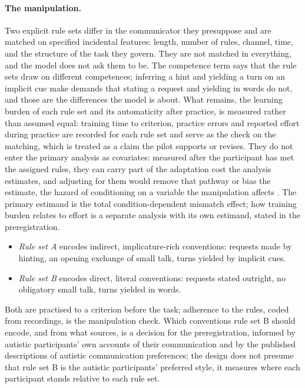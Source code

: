 \paragraph{The manipulation.} Two explicit rule sets differ in the communicator they presuppose and are matched on specified incidental features: length, number of rules, channel, time, and the structure of the task they govern. They are not matched in everything, and the model does not ask them to be. The competence term says that the rule sets draw on different competences; inferring a hint and yielding a turn on an implicit cue make demands that stating a request and yielding in words do not, and those are the differences the model is about. What remains, the learning burden of each rule set and its automaticity after practice, is measured rather than assumed equal: training time to criterion, practice errors and reported effort during practice are recorded for each rule set and serve as the check on the matching, which is treated as a claim the pilot supports or revises. They do not enter the primary analysis as covariates: measured after the participant has met the assigned rules, they can carry part of the adaptation cost the analysis estimates, and adjusting for them would remove that pathway or bias the estimate, the hazard of conditioning on a variable the manipulation affects \cite{MontgomeryNyhanTorres2018}. The primary estimand is the total condition-dependent mismatch effect; how training burden relates to effort is a separate analysis with its own estimand, stated in the preregistration.
\begin{itemize}[leftmargin=*]
\item \emph{Rule set A} encodes indirect, implicature-rich conventions: requests made by hinting, an opening exchange of small talk, turns yielded by implicit cues.
\item \emph{Rule set B} encodes direct, literal conventions: requests stated outright, no obligatory small talk, turns yielded in words.
\end{itemize}
Both are practised to a criterion before the task; adherence to the rules, coded from recordings, is the manipulation check. Which conventions rule set B should encode, and from what sources, is a decision for the preregistration, informed by autistic participants' own accounts of their communication and by the published descriptions of autistic communication preferences; the design does not presume that rule set B is the autistic participants' preferred style, it measures where each participant stands relative to each rule set.

